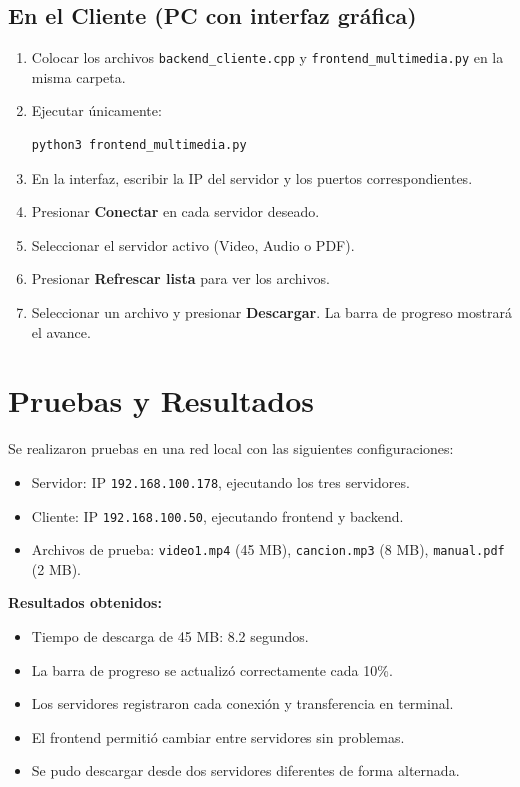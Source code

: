 \documentclass[12pt]{article}
\begin{document}
\subsection{En el Cliente (PC con interfaz gráfica)}
\begin{enumerate}
    \item Colocar los archivos \texttt{backend\_cliente.cpp} y \texttt{frontend\_multimedia.py} en la misma carpeta.
    \item Ejecutar únicamente:
    \begin{lstlisting}[language=bash]
python3 frontend_multimedia.py
    \end{lstlisting}
    \item En la interfaz, escribir la IP del servidor y los puertos correspondientes.
    \item Presionar \textbf{Conectar} en cada servidor deseado.
    \item Seleccionar el servidor activo (Video, Audio o PDF).
    \item Presionar \textbf{Refrescar lista} para ver los archivos.
    \item Seleccionar un archivo y presionar \textbf{Descargar}. La barra de progreso mostrará el avance.
\end{enumerate}

\section{Pruebas y Resultados}

Se realizaron pruebas en una red local con las siguientes configuraciones:

\begin{itemize}
    \item Servidor: IP \texttt{192.168.100.178}, ejecutando los tres servidores.
    \item Cliente: IP \texttt{192.168.100.50}, ejecutando frontend y backend.
    \item Archivos de prueba: \texttt{video1.mp4} (45 MB), \texttt{cancion.mp3} (8 MB), \texttt{manual.pdf} (2 MB).
\end{itemize}

\textbf{Resultados obtenidos:}
\begin{itemize}
    \item Tiempo de descarga de 45 MB: 8.2 segundos.
    \item La barra de progreso se actualizó correctamente cada 10\%.
    \item Los servidores registraron cada conexión y transferencia en terminal.
    \item El frontend permitió cambiar entre servidores sin problemas.
    \item Se pudo descargar desde dos servidores diferentes de forma alternada.
\end{itemize}
\end{document}
